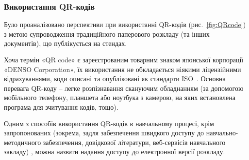 \subsubsection{Використання QR-кодів}

Було проаналізовано перспективи при використанні QR-кодів (рис.~\ref{fig:QRcode}) з метою супроводження традиційного паперового розкладу (та інших документів), що публікується на стендах.

Хоча термін «QR code» є зареєстрованим товарним знаком японської корпорації «DENSO Corporation», їх використання не обкладається ніякими ліцензійними відрахуваннями, коди описані та опубліковані як стандарти ISO~\cite{воронкін2014можливості}. Основна перевага QR-коду – легке розпізнавання скануючим обладнанням (за допомогою мобільного телефону, планшета або ноутбука з камерою, на яких встановлена програма для зчитування кодів, тощо).

Одним з способів використання QR-кодів в навчальному процесі, крім запропонованих (зокрема, задля забезпечення швидкого доступу до навчально-методичного забезпечення, довідкової літератури, веб-сервісів навчального закладу) \cite[146]{воронкін2014можливості},  можна назвати надання доступу до електронної версії розкладу.
